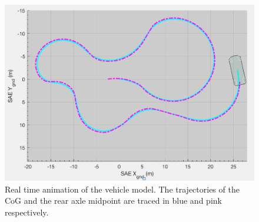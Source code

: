 \begin{figure}[htb]
    \centering
    \includegraphics[scale=0.5]{images/2danimation.png}
    \caption{Real time animation of the vehicle model. The trajectories of the CoG and the rear axle midpoint are traced in blue and pink respectively.}
	\label{animfig}
\end{figure}

